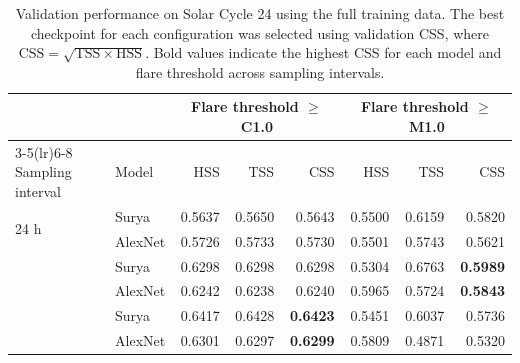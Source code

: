 
\begin{table}[t]
\centering
\caption{Validation performance on Solar Cycle 24 using the full training data. The best checkpoint for each configuration was selected using validation CSS, where $\mathrm{CSS}=\sqrt{\mathrm{TSS}\times\mathrm{HSS}}$. Bold values indicate the highest CSS for each model and flare threshold across sampling intervals.}
\label{tab:validation-full-data}
\small
\begin{tabular}{llrrr rrr}
\toprule
& & \multicolumn{3}{c}{Flare threshold $\geq$ C1.0} & \multicolumn{3}{c}{Flare threshold $\geq$ M1.0} \\
\cmidrule(lr){3-5}\cmidrule(lr){6-8}
Sampling interval & Model & HSS & TSS & CSS & HSS & TSS & CSS \\
\midrule
\multirow{2}{*}{24 h}
  & Surya   & 0.5637 & 0.5650 & 0.5643 & 0.5500 & 0.6159 & 0.5820 \\
  & AlexNet & 0.5726 & 0.5733 & 0.5730 & 0.5501 & 0.5743 & 0.5621 \\
\addlinespace
\multirow{2}{*}{12 h}
  & Surya   & 0.6298 & 0.6298 & 0.6298 & 0.5304 & 0.6763 & \textbf{0.5989} \\
  & AlexNet & 0.6242 & 0.6238 & 0.6240 & 0.5965 & 0.5724 & \textbf{0.5843} \\
\addlinespace
\multirow{2}{*}{8 h}
  & Surya   & 0.6417 & 0.6428 & \textbf{0.6423} & 0.5451 & 0.6037 & 0.5736 \\
  & AlexNet & 0.6301 & 0.6297 & \textbf{0.6299} & 0.5809 & 0.4871 & 0.5320 \\
\bottomrule
\end{tabular}
\end{table}


